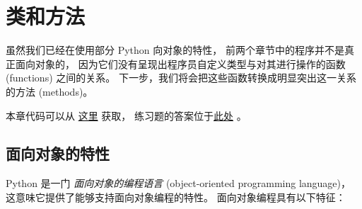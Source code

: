 

\chapter{类和方法}


虽然我们已经在使用部分 Python 向对象的特性，
前两个章节中的程序并不是真正面向对象的，
因为它们没有呈现出程序员自定义类型与对其进行操作的函数 (functions) 之间的关系。
下一步，我们将会把这些函数转换成明显突出这一关系的方法 (methods)。



本章代码可以从 \href{http://thinkpython2.com/code/Time2.py}{这里} 获取，
练习题的答案位于\href{http://thinkpython2.com/code/Point2_soln.py}{此处} 。


\section{面向对象的特性}
  


Python 是一门 {\em 面向对象的编程语言} (object-oriented programming language)，
这意味它提供了能够支持面向对象编程的特性。
面向对象编程具有以下特征：


